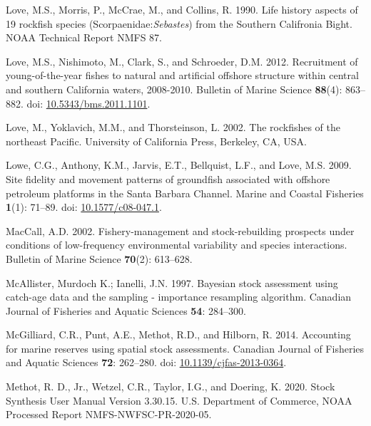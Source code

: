 \documentclass[
  english,
  a4paper,
]{article}
\newlength{\cslhangindent}
\newlength{\cslentryspacingunit} %
\newenvironment{CSLReferences}[2] %
 {%
  \setlength{\parindent}{0pt}
  \ifodd #1
  \let\oldpar\par
  \def\par{\hangindent=\cslhangindent\oldpar}
  \fi
  \setlength{\parskip}{#2\cslentryspacingunit}
 }%
 {}
\begin{document}
\begin{CSLReferences}{1}{0}
\leavevmode{}%
Love, M.S., Morris, P., McCrae, M., and Collins, R. 1990. {Life history aspects of 19 rockfish species (Scorpaenidae:\emph{Sebastes}) from the Southern Califronia Bight}. NOAA Technical Report NMFS 87.

\leavevmode{}%
Love, M.S., Nishimoto, M., Clark, S., and Schroeder, D.M. 2012. {Recruitment of young-of-the-year fishes to natural and artificial offshore structure within central and southern California waters, 2008-2010}. Bulletin of Marine Science \textbf{88}(4): 863--882. doi: \href{https://doi.org/10.5343/bms.2011.1101}{10.5343/bms.2011.1101}.

\leavevmode{}%
Love, M., Yoklavich, M.M., and Thorsteinson, L. 2002. {The rockfishes of the northeast Pacific}. University of California Press, Berkeley, CA, USA.

\leavevmode{}%
Lowe, C.G., Anthony, K.M., Jarvis, E.T., Bellquist, L.F., and Love, M.S. 2009. {Site fidelity and movement patterns of groundfish associated with offshore petroleum platforms in the Santa Barbara Channel}. Marine and Coastal Fisheries \textbf{1}(1): 71--89. doi: \href{https://doi.org/10.1577/c08-047.1}{10.1577/c08-047.1}.

\leavevmode{}%
MacCall, A.D. 2002. {Fishery-management and stock-rebuilding prospects under conditions of low-frequency environmental variability and species interactions}. Bulletin of Marine Science \textbf{70}(2): 613--628.

\leavevmode{}%
McAllister, Murdoch K.; Ianelli, J.N. 1997. {Bayesian stock assessment using catch-age data and the sampling - importance resampling algorithm}. Canadian Journal of Fisheries and Aquatic Sciences \textbf{54}: 284--300.

\leavevmode{}%
McGilliard, C.R., Punt, A.E., Methot, R.D., and Hilborn, R. 2014. {Accounting for marine reserves using spatial stock assessments}. Canadian Journal of Fisheries and Aquatic Sciences \textbf{72}: 262--280. doi: \href{https://doi.org/10.1139/cjfas-2013-0364}{10.1139/cjfas-2013-0364}.

\leavevmode{}%
Methot, R. D., Jr., Wetzel, C.R., Taylor, I.G., and Doering, K. 2020. {Stock Synthesis User Manual Version 3.30.15}. U.S. Department of Commerce, NOAA Processed Report NMFS-NWFSC-PR-2020-05.


\end{CSLReferences}
\end{document}
